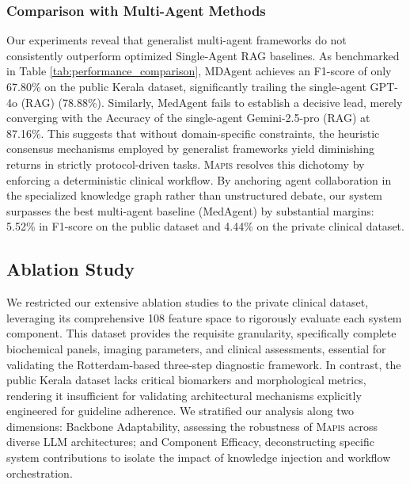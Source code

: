 \documentclass[a4paper,fleqn]{cas-dc}
\begin{document}
\subsubsection{Comparison with Multi-Agent Methods}\label{vsmulti}
Our experiments reveal that generalist multi-agent frameworks do not consistently outperform optimized Single-Agent RAG baselines. As benchmarked in Table \ref{tab:performance_comparison}, MDAgent achieves an F1-score of only 67.80\% on the public Kerala dataset, significantly trailing the single-agent GPT-4o (RAG) (78.88\%). Similarly, MedAgent fails to establish a decisive lead, merely converging with the Accuracy of the single-agent Gemini-2.5-pro (RAG) at 87.16\%. This suggests that without domain-specific constraints, the heuristic consensus mechanisms employed by generalist frameworks yield diminishing returns in strictly protocol-driven tasks. \textsc{Mapis} resolves this dichotomy by enforcing a deterministic clinical workflow. By anchoring agent collaboration in the specialized knowledge graph rather than unstructured debate, our system surpasses the best multi-agent baseline (MedAgent) by substantial margins: 5.52\% in F1-score on the public dataset and 4.44\% on the private clinical dataset. 

\subsection{Ablation Study}
We restricted our extensive ablation studies to the private clinical dataset, leveraging its comprehensive 108 feature space to rigorously evaluate each system component. This dataset provides the requisite granularity, specifically complete biochemical panels, imaging parameters, and clinical assessments, essential for validating the Rotterdam-based three-step diagnostic framework. In contrast, the public Kerala dataset lacks critical biomarkers and morphological metrics, rendering it insufficient for validating architectural mechanisms explicitly engineered for guideline adherence. We stratified our analysis along two dimensions: Backbone Adaptability, assessing the robustness of \textsc{Mapis} across diverse LLM architectures; and Component Efficacy, deconstructing specific system contributions to isolate the impact of knowledge injection and workflow orchestration.



\end{document}
